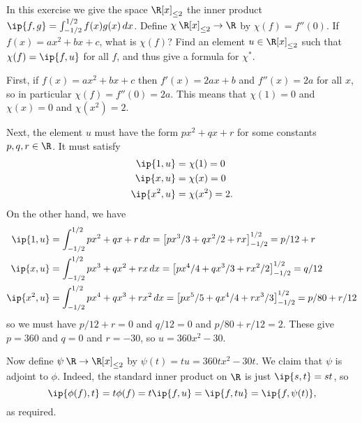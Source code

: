 \begin{exercise}\label{ex-adjoint-v}
 In this exercise we give the space $\R[x]_{\leq 2}$ the
 inner product $\ip{f,g}=\int_{-1/2}^{1/2}f(x)g(x)\,dx$.
 Define $\chi\:\R[x]_{\leq 2}\to\R$ by $\chi(f)=f''(0)$.  If
 $f(x)=ax^2+bx+c$, what is $\chi(f)$?  Find an element
 $u\in\R[x]_{\leq 2}$ such that $\chi(f)=\ip{f,u}$ for all
 $f$, and thus give a formula for $\chi^*$.
\end{exercise}
\begin{solution}
 First, if $f(x)=ax^2+bx+c$ then $f'(x)=2ax+b$ and
 $f''(x)=2a$ for all $x$, so in particular
 $\chi(f)=f''(0)=2a$.  This means that $\chi(1)=0$ and
 $\chi(x)=0$ and $\chi(x^2)=2$.

 Next, the element $u$ must have the form $px^2+qx+r$ for some
 constants $p,q,r\in\R$.  It must satisfy
 \begin{align*}
  \ip{1,u} &= \chi(1) = 0 \\
  \ip{x,u} &= \chi(x) = 0 \\
  \ip{x^2,u} &= \chi(x^2) = 2.
 \end{align*}
 On the other hand, we have 
 \begin{align*}
  \ip{1,u}
   &= \int_{-1/2}^{1/2} px^2+qx+r\,dx 
    = \left[ px^3/3 + qx^2/2 + rx \right]_{-1/2}^{1/2}
    = p/12 + r \\
  \ip{x,u}
   &= \int_{-1/2}^{1/2} px^3+qx^2+rx\,dx 
    = \left[ px^4/4 + qx^3/3 + rx^2/2 \right]_{-1/2}^{1/2}
    = q/12 \\
  \ip{x^2,u}
   &= \int_{-1/2}^{1/2} px^4+qx^3+rx^2\,dx 
    = \left[ px^5/5 + qx^4/4 + rx^3/3 \right]_{-1/2}^{1/2}
    = p/80 + r/12
 \end{align*}
 so we must have
 $p/12+r=0$ and $q/12=0$ and $p/80+r/12=2$.  These give
 $p=360$ and $q=0$ and $r=-30$, so $u=360x^2-30$.  

 Now define $\psi\:\R\to\R[x]_{\leq 2}$ by $\psi(t)=tu=360
 tx^2-30t$.  We claim that $\psi$ is adjoint to $\phi$.
 Indeed, the standard inner product on $\R$ is just
 $\ip{s,t}=st$, so
 \[ \ip{\phi(f),t} = t\phi(f)=t\ip{f,u}=\ip{f,tu}=\ip{f,\psi(t)},
 \]
 as required.
\end{solution}

